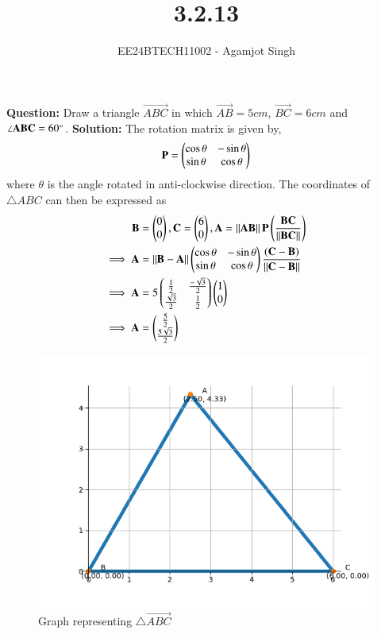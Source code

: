 \documentclass[journal]{IEEEtran}
\begin{document}

\vspace{3cm}

\title{3.2.13}
\author{EE24BTECH11002 - Agamjot Singh}
{\let\newpage\relax\maketitle}

\renewcommand{\thefigure}{\theenumi}
\renewcommand{\thetable}{\theenumi}
\setlength{\intextsep}{10pt} %

\textbf{Question:}
\newline
Draw a triangle $\vec{ABC}$ in which $\vec{AB} = 5 cm$, $\vec{BC} = 6 cm$ and $\angle\mathbf{ABC} = 60\degree$.
\newline
\textbf{Solution:}
\newline
The rotation matrix  is given by,
\begin{align}
	\mathbf{P} = \begin{pmatrix}\cos{\theta} & -\sin{\theta}\\\sin{\theta} & \cos{\theta}\end{pmatrix}
\end{align}
where $\theta$ is the angle rotated in anti-clockwise direction.
\newline
The coordinates of $\triangle ABC$ can then be expressed as
\begin{align}
	\mathbf{B} &= \begin{pmatrix}0\\0\end{pmatrix}, \mathbf{C} = \begin{pmatrix}6\\0\end{pmatrix}, \mathbf{A} = \left\lVert\mathbf{AB}\right\rVert\mathbf{P}\left(\frac{\mathbf{BC}}{\left\lVert\mathbf{BC}\right\rVert}\right)\\
	\implies \mathbf{A} &= \left\lVert\mathbf{B} - \mathbf{A}\right\rVert\begin{pmatrix}\cos{\theta} & -\sin{\theta}\\\sin{\theta} & \cos{\theta}\end{pmatrix}\frac{\left(\mathbf{C} - \mathbf{B}\right)}{\left\lVert\mathbf{C} - \mathbf{B}\right\rVert}\\
	\implies \mathbf{A} &= 5\begin{pmatrix}\frac{1}{2} & \frac{-\sqrt{3}}{2}\\\frac{\sqrt{3}}{2} & \frac{1}{2}\end{pmatrix}\begin{pmatrix}1\\0\end{pmatrix}\\
	\implies \mathbf{A} &= \begin{pmatrix}\frac{5}{2}\\\frac{5\sqrt{3}}{2}\end{pmatrix}
\end{align}

\begin{figure}[h!]
   \centering
   \includegraphics[width=0.7\linewidth]{figs/graph.png}
   \caption{Graph representing $\triangle \vec{ABC}$}
\end{figure}
\end{document}
